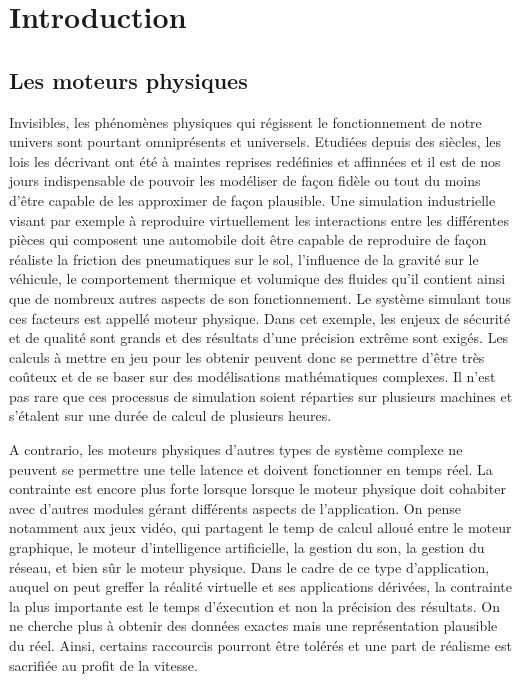 \section{Introduction}

\subsection{Les moteurs physiques}

Invisibles, les phénomènes physiques qui régissent le fonctionnement de notre univers sont pourtant omniprésents et universels. Etudiées depuis des siècles, les lois les décrivant ont été à maintes reprises redéfinies et affinnées et il est de nos jours indispensable de pouvoir les modéliser de façon fidèle ou tout du moins d'être capable de les approximer de façon plausible. 
Une simulation industrielle visant par exemple à reproduire virtuellement les interactions entre les différentes pièces qui composent une automobile doit être capable de reproduire de façon réaliste la friction des pneumatiques sur le sol, l'influence de la gravité sur le véhicule, le comportement thermique et volumique des fluides qu'il contient ainsi que de nombreux autres aspects de son fonctionnement. Le système simulant tous ces facteurs est appellé moteur physique. Dans cet exemple, les enjeux de sécurité et de qualité sont grands et des résultats d'une précision extrême sont exigés. Les calculs à mettre en jeu pour les obtenir peuvent donc se permettre d'être très coûteux et de se baser sur des modélisations mathématiques complexes. Il n'est pas rare que ces processus de simulation soient réparties sur plusieurs machines et s'étalent sur une durée de calcul de plusieurs heures.

A contrario, les moteurs physiques d'autres types de système complexe ne peuvent se permettre une telle latence et doivent fonctionner en temps réel. La contrainte est encore plus forte lorsque lorsque le moteur physique doit cohabiter avec d'autres modules gérant différents aspects de l'application. On pense notamment aux jeux vidéo, qui partagent le temp de calcul alloué entre le moteur graphique, le moteur d'intelligence artificielle, la gestion du son, la gestion du réseau, et bien sûr le moteur physique. Dans le cadre de ce type d'application, auquel on peut greffer la réalité virtuelle et ses applications dérivées, la contrainte la plus importante est le temps d'éxecution et non la précision des résultats. On ne cherche plus à obtenir des données exactes mais une représentation plausible du réel. Ainsi, certains raccourcis pourront être tolérés et une part de réalisme est sacrifiée au profit de la vitesse.

